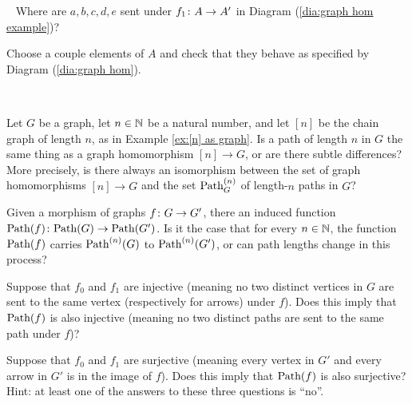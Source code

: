 \documentclass[CT4S-EN-RU]{subfiles}
\begin{document}
\begin{exampleRUS}\label{ex:graph hom}
\end{exampleRUS}

\begin{exerciseENG}~
\sexc Where are $a,b,c,d,e$ sent under $f_1\colon A\rightarrow A'$ in Diagram (\ref{dia:graph hom example})? 
\item Choose a couple elements of $A$ and check that they behave as specified by Diagram (\ref{dia:graph hom}).
\endsexc
\end{exerciseENG}

\begin{exerciseRUS}~
\end{exerciseRUS}

\begin{exerciseENG}
Let $G$ be a graph, let $n\in{\mathbb N}$ be a natural number, and let $[n]$ be the chain graph of length $n$, as in Example \ref{ex:[n] as graph}. Is a path of length $n$ in $G$ the same thing as a graph homomorphism $[n]\to G$, or are there subtle differences? More precisely, is there always an isomorphism between the set of graph homomorphisms $[n]\to G$ and the set $\textnormal{Path}_G^{(n)}$ of length-$n$ paths in $G$?
\end{exerciseENG}

\begin{exerciseRUS}
\end{exerciseRUS}

\begin{exerciseENG}
Given a morphism of graphs $f\colon G\rightarrow G'$, there an induced function $\textnormal{Path}(f)\colon\textnormal{Path}(G)\rightarrow\textnormal{Path}(G')$. 
\sexc Is it the case that for every $n\in{\mathbb N}$, the function $\textnormal{Path}(f)$ carries $\textnormal{Path}^{(n)}(G)$ to $\textnormal{Path}^{(n)}(G')$, or can path lengths change in this process?
\item Suppose that $f_0$ and $f_1$ are injective (meaning no two distinct vertices in $G$ are sent to the same vertex (respectively for arrows) under $f$). Does this imply that $\textnormal{Path}(f)$ is also injective (meaning no two distinct paths are sent to the same path under $f$)?
\item Suppose that $f_0$ and $f_1$ are surjective (meaning every vertex in $G'$ and every arrow in $G'$ is in the image of $f$). Does this imply that $\textnormal{Path}(f)$ is also surjective? Hint: at least one of the answers to these three questions is “no”.
\endsexc
\end{exerciseENG}

\begin{exerciseRUS}
\end{exerciseRUS}
\end{document}
